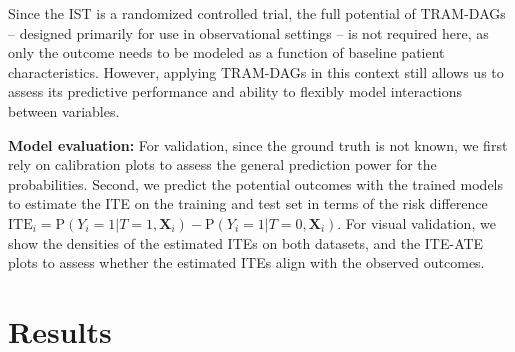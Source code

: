 Since the IST is a randomized controlled trial, the full potential of TRAM-DAGs -- designed primarily for use in observational settings -- is not required here, as only the outcome needs to be modeled as a function of baseline patient characteristics. However, applying TRAM-DAGs in this context still allows us to assess its predictive performance and ability to flexibly model interactions between variables.



\medskip

\textbf{Model evaluation: } For validation, since the ground truth is not known, we first rely on calibration plots to assess the general prediction power for the probabilities. Second, we predict the potential outcomes with the trained models to estimate the ITE on the training and test set in terms of the risk difference $\text{ITE}_i = \text{P}(Y_i=1|T=1, \mathbf{X}_i) - \text{P}(Y_i=1|T=0, \mathbf{X}_i)$. For visual validation, we show the densities of the estimated ITEs on both datasets, and the ITE-ATE plots to assess whether the estimated ITEs align with the observed outcomes.














\section{Results} \label{sec:results_experiment2}


